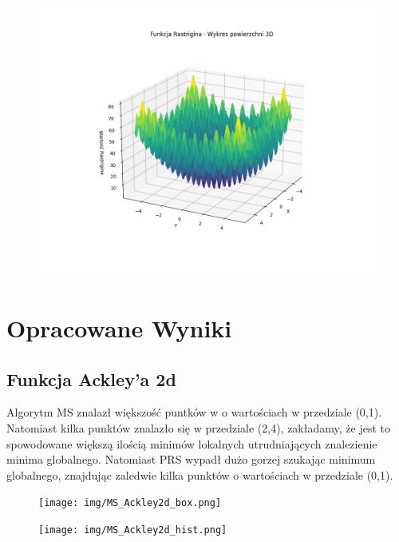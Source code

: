 \documentclass{article}
\begin{document}
\begin{figure}[H]
    \centering
    \includegraphics[width=1\textwidth]{img/RastriginFunction.png}
    \label{fig:rastrigin}
\end{figure}

\newpage

\section{Opracowane Wyniki}
\subsection{Funkcja Ackley'a 2d}

\hspace{0.5cm} Algorytm MS znalazł większość puntków w o wartościach w przedziale (0,1). Natomiast kilka punktów znalazło się w przedziale (2,4), zakładamy, że jest to spowodowane większą ilością minimów lokalnych utrudniających znalezienie minima globalnego. Natomiast PRS wypadł dużo gorzej szukając minimum globalnego, znajdując zaledwie kilka punktów o wartościach w przedziale (0,1).

\begin{figure}[H]
    \centering
    \texttt{[image: img/MS\_Ackley2d\_box.png]}
    \label{fig:ackley}
\end{figure}

\begin{figure}[H]
    \centering
    \texttt{[image: img/MS\_Ackley2d\_hist.png]}
    \label{fig:ackley}
\end{figure}
\end{document}
